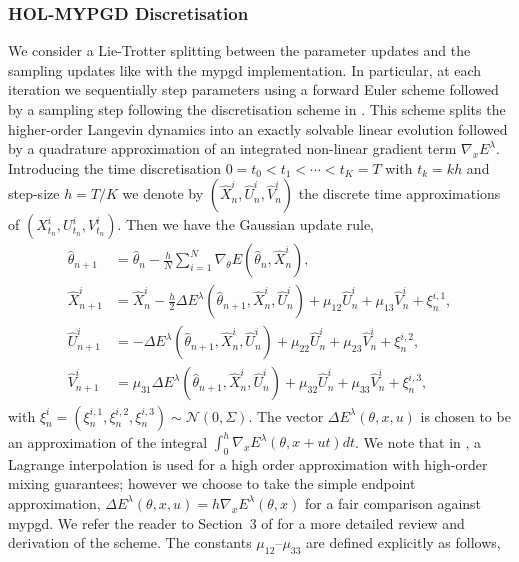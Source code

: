 \subsubsection{\textsc{\small HOL-MYPGD} Discretisation}

We consider a Lie-Trotter splitting between the parameter updates and the sampling updates like with the \gls*{mypgd} implementation. In particular, at each iteration we sequentially step parameters using a forward Euler scheme followed by a sampling step following the discretisation scheme in \citet{high_order_langevin_JMLR}. This scheme splits the higher-order Langevin dynamics into an exactly solvable linear evolution followed by a quadrature approximation of an integrated non-linear gradient term $\nabla_x E^\lambda$. Introducing the time discretisation $0=t_0<t_1<\cdots<t_K=T$ with $t_k=kh$ and step-size $h=T/K$ we denote by $(\hat X^i_n,\hat U^i_n,\hat V^i_n)$ the discrete time approximations of $(X^i_{t_n},U^i_{t_n},V^i_{t_n})$. Then we have the Gaussian update rule,
\begin{equation*}
    \begin{aligned}
        \hat\theta_{n+1}&=\hat\theta_n-\frac{h}{N}\sum_{i=1}^N\nabla_\theta E(\hat\theta_n,\hat X^i_n),\\
        \hat X^i_{n+1}&=\hat X^i_{n}-\frac{h}{2}\Delta E^\lambda\left(\hat\theta_{n+1},\hat{X}^i_n,\hat U^i_n\right)+\mu_{12}\hat U^i_n+\mu_{13}\hat V^i_n+\xi_n^{i,1}, \\
        \hat U^i_{n+1}&=-\Delta E^\lambda\left(\hat\theta_{n+1},\hat{X}^i_n,\hat U^i_n\right)+\mu_{22}\hat U^i_n+\mu_{23}\hat V^i_n+\xi^{i,2}_n,\\
        \hat V^i_{n+1}&=\mu_{31}\Delta E^\lambda\left(\hat\theta_{n+1},\hat{X}^i_n,\hat U^i_n\right)+\mu_{32}\hat U^i_n+\mu_{33}\hat V^i_n+\xi^{i,3}_n,
    \end{aligned}
\end{equation*}
with $\xi^i_n=(\xi^{i,1}_n,\xi^{i,2}_n,\xi^{i,3}_n)\sim\mathcal{N}(0,\Sigma)$. The vector $\Delta E^\lambda(\theta,x,u)$ is chosen to be an approximation of the integral $\int_0^h\nabla_xE^{\lambda}(\theta,x+ut)dt$. We note that in \citet{high_order_langevin_JMLR}, a Lagrange interpolation is used for a high order approximation with high-order mixing guarantees; however we choose to take the simple endpoint approximation, $\Delta E^\lambda(\theta,x,u)=h\nabla_xE^\lambda(\theta,x)$ for a fair comparison against \gls*{mypgd}. We refer the reader to Section~3 of \citet{high_order_langevin_JMLR} for a more detailed review and derivation of the scheme. The constants $\mu_{12}$--$\mu_{33}$ are defined explicitly as follows,

